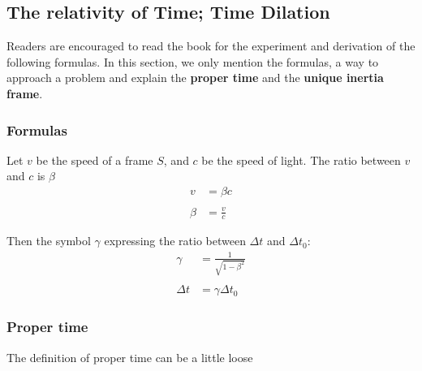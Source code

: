 \subsection{The relativity of Time; Time Dilation}
Readers are encouraged to  read the book for the experiment and derivation of the following formulas. In this section, we only mention the formulas, a way to approach a problem and explain the \textbf{proper time} and the \textbf{unique inertia frame}.

\subsubsection{Formulas}

Let $v$ be the speed of a frame $S$, and $c$ be the speed of light. The ratio between $v$ and $c$ is $\beta$
\begin{align*}
    v &= \beta c \\ \\
    \beta &= \frac{v}{c}
\end{align*}

Then the symbol $\gamma$ expressing the ratio between $\Delta t$ and $\Delta t_0$:
\begin{align*}
    \gamma &= \frac{1}{\sqrt{1-\beta^2}} \\\\
     \Delta t &= \gamma \Delta t_0
\end{align*}

\subsubsection{Proper time}

The definition of proper time can be a little loose 